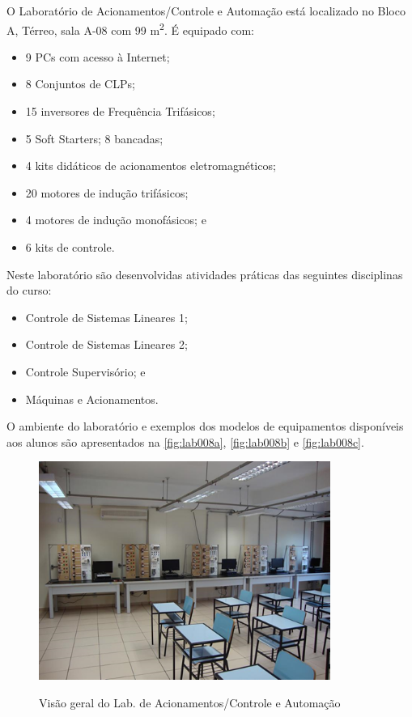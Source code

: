 O Laboratório de Acionamentos/Controle e Automação está localizado no Bloco A, Térreo, sala A-08 com 99 m\textsuperscript{2}. É equipado com:

\begin{itemize}
    \item 9 PCs com acesso à Internet; 
    \item 8 Conjuntos de CLPs; 
    \item 15 inversores de Frequência Trifásicos; 
    \item 5 Soft Starters; 8 bancadas; 
    \item 4 kits didáticos de acionamentos eletromagnéticos; 
    \item 20 motores de indução trifásicos; 
    \item 4 motores de indução monofásicos; e 
    \item 6 kits de controle.    
\end{itemize}

Neste laboratório são desenvolvidas atividades práticas das seguintes disciplinas do curso:

\begin{itemize}
    \item Controle de Sistemas Lineares 1;
    \item Controle de Sistemas Lineares 2;
    \item Controle Supervisório; e
    \item Máquinas e Acionamentos.
    
\end{itemize}

O ambiente do laboratório e exemplos dos modelos de equipamentos disponíveis aos alunos são apresentados na \autoref{fig:lab008a}, \autoref{fig:lab008b} e \autoref{fig:lab008c}.

\begin{figure}[!htb]
    \centering
    \caption{Visão geral do Lab. de Acionamentos/Controle e Automação}
    \includegraphics[width=0.85\textwidth]{Caps/Figs/lab008a.png}
    \fonte{\utf}
    \label{fig:lab008a}
\end{figure}

